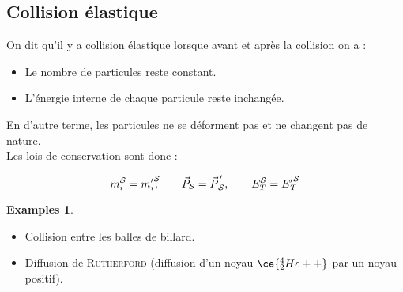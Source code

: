 \documentclass[12pt,a4paper,oneside,french]{book}
\newcommand{\pvec}[1]{\vec{#1} \mkern2mu \vphantom{#1}}
\theoremstyle{definition}
\theoremstyle{definition}
\theoremstyle{definition}
\newtheorem*{examples}{Examples}
\theoremstyle{remark}
\theoremstyle{definition}
\begin{document}
    \subsection{Collision élastique}
    On dit qu'il y a collision élastique lorsque avant et après la collision on a :
    
    \begin{itemize}
        \item 
        Le nombre de particules reste constant.
        
        \item
        L'énergie interne de chaque particule reste inchangée.
    \end{itemize}
    
    \bigskip
    
    En d'autre terme, les particules ne se déforment pas et ne changent pas de nature. \\
    
    Les lois de conservation sont donc :
    
    \begin{equation*}
        {m}_{i}^{\mathcal{S}} = {m'}_{\!\! i}^{\mathcal{S}}\!\!\!, \qquad {\vec{P}}_{\mathcal{S}} = {\pvec{P}}_{\! \mathcal{S}}', \qquad {E}_{T}^{\mathcal{S}} = {E'}_{\!\! T}^{\mathcal{S}}
    \end{equation*}
    
    \begin{examples}
        \leavevmode
        
        \begin{itemize}
            \item 
            Collision entre les balles de billard.
            
            \item
            Diffusion de \textsc{Rutherford} (diffusion d'un noyau $\ce{^{4}_{2}He++}$ par un noyau positif).
        \end{itemize}
    \end{examples}
    
\end{document}
